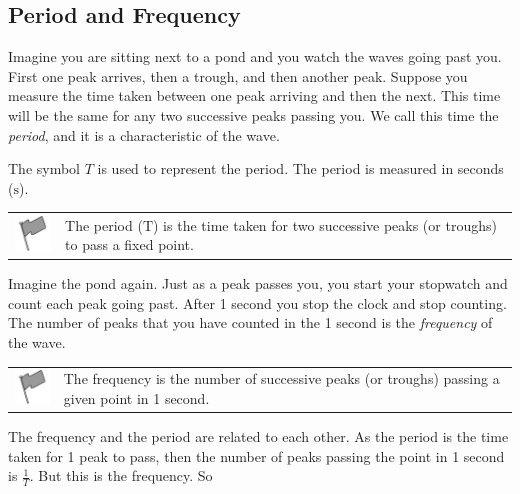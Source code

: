             \subsection{ Period and Frequency}
            \nopagebreak
        \label{m38806*id319195}Imagine you are sitting next to a pond and you watch the waves going past you. First one peak arrives, then a trough, and then another peak. Suppose you measure the time taken between one peak arriving and then the next. This time will be the same for any two successive peaks passing you. We call this
time the \textsl{period}, and it is a characteristic of the wave.\par 
        \label{m38806*id319207}The symbol $T$ is used to represent the period. The period is measured in seconds ($\mathrm{s}$).\par 
\label{m38806*fhsst!!!underscore!!!id426}\begin{definition}
	  \begin{tabular*}{15 cm}{m{15 mm}m{}}
	\hspace*{-50pt}  \includegraphics[width=0.5in]{col11305.imgs/psflag2.png}   & \Definition{   \label{id2440606}\textbf{ Period ($\mathrm{T}$) }} { \label{m38806*meaningfhsst!!!underscore!!!id426}The period ($\mathrm{T}$) is the time taken for two successive peaks (or troughs) to pass a fixed point.
         } 
      \end{tabular*}
      \end{definition}
        \label{m38806*id319238}Imagine the pond again. Just as a peak passes you, you start your stopwatch and count each peak going past. After 1 second you stop the clock and stop counting. The number of peaks that you have counted in the 1 second is the \textsl{frequency} of the wave.\par 
\label{m38806*fhsst!!!underscore!!!id430}\begin{definition}
	  \begin{tabular*}{15 cm}{m{15 mm}m{}}
	\hspace*{-50pt}  \includegraphics[width=0.5in]{col11305.imgs/psflag2.png}   & \Definition{   \label{id2440655}\textbf{ Frequency }} { \label{m38806*meaningfhsst!!!underscore!!!id430}
        The frequency is the number of successive peaks (or troughs) passing a given point in 1 second.
         } 
      \end{tabular*}
      \end{definition}
        \label{m38806*id319268}The frequency and the period are related to each other. As the period is the time taken for 1 peak to pass, then the number of peaks passing the point in 1 second is $\frac{1}{T}$. But this is the frequency. So\par 
        \label{m38806*id319287}\nopagebreak\noindent{}
          
